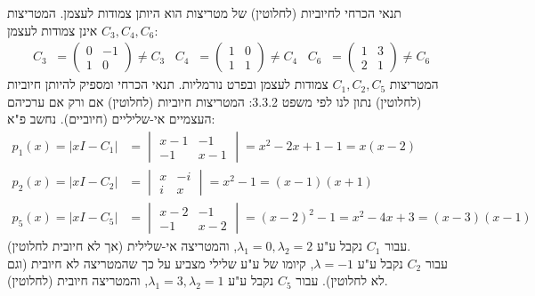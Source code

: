 \documentclass{article}
\DeclareMathOperator{\adj}{^\ast}
\begin{document}
תנאי הכרחי לחיוביות (לחלוטין) של מטריצות הוא היותן צמודות לעצמן. המטריצות $C_3, C_4, C_6$ אינן צמודות לעצמן:
\begin{align*}
    C_3\adj = \begin{pmatrix}
                  0 & -1 \\
                  1 & 0
              \end{pmatrix}\ne C_3 \;\;\;
    C_4\adj = \begin{pmatrix}
                  1 & 0 \\
                  1 & 1
              \end{pmatrix}\ne C_4 \;\;\;
    C_6 \adj = \begin{pmatrix}
                   1 & 3 \\
                   2 & 1
               \end{pmatrix}\ne C_6
\end{align*}
המטריצות $C_1, C_2, C_5$ צמודות לעצמן ובפרט נורמליות. תנאי הכרחי ומספיק להיותן חיוביות (לחלוטין) נתון לנו לפי משפט 3.3.2: המטריצות חיוביות (לחלוטין) אם ורק אם ערכיהם העצמיים אי-שליליים (חיוביים). נחשב פ"א:
\begin{align*}
    p_1(x)=|xI-C_1| & =\begin{vmatrix}
                           x-1 & -1  \\
                           -1  & x-1
                       \end{vmatrix}=x^2-2x+1-1=x(x-2)             \\
    p_2(x)=|xI-C_2| & =\begin{vmatrix}
                           x & -i \\
                           i & x
                       \end{vmatrix}=x^2-1=(x-1)(x+1)              \\
    p_5(x)=|xI-C_5| & =\begin{vmatrix}
                           x-2 & -1  \\
                           -1  & x-2
                       \end{vmatrix}=(x-2)^2-1=x^2-4x+3=(x-3)(x-1)
\end{align*}
עבור $C_1$ נקבל ע"ע $\lambda_1=0, \lambda_2=2$, והמטריצה אי-שלילית (אך לא חיובית לחלוטין).\\
עבור $C_2$ נקבל ע"ע $\lambda=-1$, קיומו של ע"ע שלילי מצביע על כך שהמטריצה לא חיובית (וגם לא לחלוטין).
עבור $C_5$ נקבל ע"ע $\lambda_1=3, \lambda_2=1$, והמטריצה חיובית (לחלוטין).


\pagebreak
\end{document}
